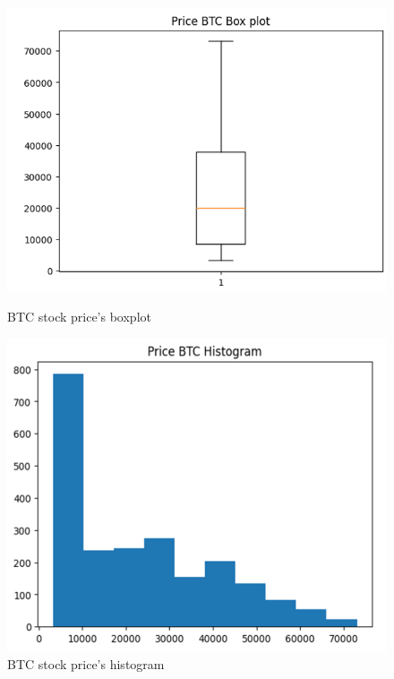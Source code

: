 \documentclass{ieeeojies}
\begin{document}
\begin{figure}[H]
    \centering
    \begin{minipage}{0.23\textwidth}
    \centering
    \includegraphics[width=1\textwidth]{bibliography/Figure/BTC_BOXPLOT.png}
    \caption{BTC stock price's boxplot}
    \label{fig:1}
    \end{minipage}
    \hfill
    \begin{minipage}{0.23\textwidth}
    \centering
    \includegraphics[width=1\textwidth]{bibliography/Figure/BTC_HISTOGRAM.png}
    \caption{BTC stock price's histogram}
    \label{fig:2}
    \end{minipage}
\end{figure}
\end{document}
